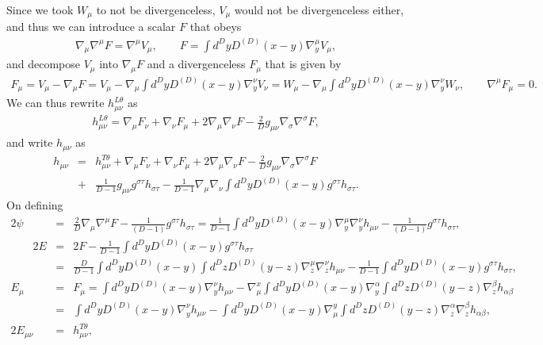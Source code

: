 \documentclass[aps]{revtex4}
\begin{document}
Since we took $W_{\mu}$ to not be divergenceless, $V_{\mu}$ would not be divergenceless either, and thus we can introduce a scalar $F$ that obeys
%
\begin{eqnarray}
\nabla_{\mu}\nabla^{\mu}F=\nabla^{\mu}V_{\mu},\qquad F=\int d^Dy D^{(D)}(x-y)\nabla_y^{\mu}V_{\mu},
\label{E18}
\end{eqnarray}
%
and decompose $V_{\mu}$ into $\nabla_{\mu}F$ and a divergenceless $F_{\mu}$ that is  given by
%
\begin{eqnarray}
F_{\mu}=V_{\mu}-\nabla_{\mu}F=V_{\mu}-\nabla_{\mu}\int d^Dy D^{(D)}(x-y)\nabla_y^{\nu}V_{\nu}=
W_{\mu}-\nabla_{\mu}\int d^Dy D^{(D)}(x-y)\nabla_y^{\nu}W_{\nu},\qquad \nabla^{\mu}F_{\mu}=0.
\label{E19}
\end{eqnarray}
%
We can thus rewrite $h^{L\theta}_{\mu\nu}$ as 
%
\begin{eqnarray}
h^{L\theta}_{\mu\nu}= \nabla_{\mu}F_{\nu}+\nabla_{\nu}F_{\mu}+2\nabla_{\mu}\nabla_{\nu}F-\frac{2}{D}g_{\mu\nu}\nabla_{\sigma}\nabla^{\sigma}F,
\label{E20}
\end{eqnarray}
%
and write $h_{\mu\nu}$ as 
%
\begin{eqnarray}
h_{\mu\nu}&=&h^{T\theta}_{\mu\nu}+ \nabla_{\mu}F_{\nu}+\nabla_{\nu}F_{\mu}+2\nabla_{\mu}\nabla_{\nu}F-\frac{2}{D}g_{\mu\nu}\nabla_{\sigma}\nabla^{\sigma}F
\nonumber\\
&+&\frac{1}{D-1}g_{\mu\nu}g^{\sigma\tau}h_{\sigma\tau}
-\frac{1}{D-1}\nabla_{\mu}\nabla_{\nu}\int d^Dy D^{(D)}(x-y)g^{\sigma\tau}h_{\sigma\tau}.
\label{E21}
\end{eqnarray}
%
On defining
%
\begin{eqnarray}
2\psi&=&\frac{2}{D}\nabla_{\mu}\nabla^{\mu}F-\frac{1}{(D-1)}g^{\sigma\tau}h_{\sigma\tau}
=\frac{1}{D-1}\int d^Dy D^{(D)}(x-y)\nabla_y^{\mu}\nabla_y^{\nu}h_{\mu\nu}-\frac{1}{(D-1)}g^{\sigma\tau}h_{\sigma\tau},
\nonumber\\
\qquad 2E&=&2F-\frac{1}{D-1}\int d^Dy D^{(D)}(x-y)g^{\sigma\tau}h_{\sigma\tau}
\nonumber\\
&=&\frac{D}{D-1}\int d^Dy D^{(D)}(x-y)\int d^Dz D^{(D)}(y-z)\nabla_z^{\mu}\nabla_z^{\nu}h_{\mu\nu} -\frac{1}{D-1}\int d^Dy D^{(D)}(x-y)g^{\sigma\tau}h_{\sigma\tau},
\nonumber\\
 E_{\mu}&=&F_{\mu}=\int d^Dy D^{(D)}(x-y)\nabla_y^{\nu}h_{\mu\nu}
 -\nabla^x_{\mu}\int d^Dy D^{(D)}(x-y)\nabla_y^{\alpha}\int d^Dz D^{(D)}(y-z)\nabla_z^{\beta}h_{\alpha\beta}
 \nonumber\\
 &=&\int d^Dy D^{(D)}(x-y)\nabla_y^{\nu}h_{\mu\nu}
 -\int d^Dy D^{(D)}(x-y)\nabla^y_{\mu}\int d^Dz D^{(D)}(y-z)\nabla_z^{\alpha}\nabla_z^{\beta}h_{\alpha\beta},
\nonumber\\
2E_{\mu\nu}&=&h^{T\theta}_{\mu\nu},
\label{E22}
\end{eqnarray}
\end{document}

